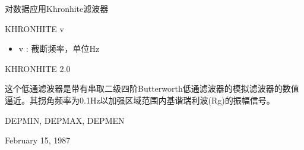 \label{cmd:khronhite}

对数据应用Khronhite滤波器

KHRONHITE {v}

\begin{itemize}
\item v : 截断频率，单位Hz
\end{itemize}

KHRONHITE 2.0

这个低通滤波器是带有串取二级四阶Butterworth低通滤波器的模拟滤波器的数值逼近。其拐角频率为0.1Hz以加强区域范围内基谐瑞利波(Rg)的振幅信号。

DEPMIN, DEPMAX, DEPMEN

February 15, 1987
